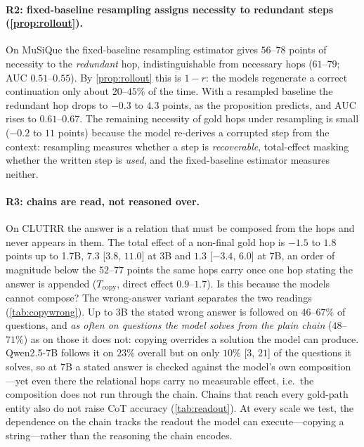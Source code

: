 \documentclass[11pt]{article}
\newcommand{\reldir}{../results/reliance_v2}
\newcommand{\maybeinput}[1]{\IfFileExists{#1}{}{}}
\begin{document}
\paragraph{R2: fixed-baseline resampling assigns necessity to redundant steps (\cref{prop:rollout}).}
On MuSiQue the fixed-baseline resampling estimator gives $56$--$78$ points of necessity to the
\emph{redundant} hop, indistinguishable from necessary hops ($61$--$79$; AUC $0.51$--$0.55$). By
\cref{prop:rollout} this is $1-r$: the models regenerate a correct continuation only about
$20$--$45\%$ of the time. With a resampled baseline the redundant hop drops to $-0.3$ to $4.3$
points, as the proposition predicts, and AUC rises to $0.61$--$0.67$. The remaining necessity of
gold hops under resampling is small ($-0.2$ to $11$ points) because the model re-derives a
corrupted step from the context: resampling measures whether a step is \emph{recoverable},
total-effect masking whether the written step is \emph{used}, and the fixed-baseline estimator
measures neither.

\begin{table}[h]
\centering\small
\caption{Wrong-answer copy. A final hop stating a wrong relation is appended to a CLUTRR gold chain;
we report how often the model's answer is that wrong relation, overall and on questions it answers
correctly from the plain gold chain (PS$=1$).}
\label{tab:copywrong}
\maybeinput{\reldir/tab_copy_wrong.tex}
\end{table}

\paragraph{R3: chains are read, not reasoned over.} On CLUTRR the answer is a relation that must
be composed from the hops and never appears in them. The total effect of a non-final gold hop is
$-1.5$ to $1.8$ points up to 1.7B, $7.3$ [$3.8$, $11.0$] at 3B and $1.3$ [$-3.4$, $6.0$] at 7B,
an order of magnitude below the $52$--$77$ points the same hops carry once one hop stating the
answer is appended ($T_{\text{copy}}$, direct effect $0.9$--$1.7$). Is this because the models
cannot compose? The wrong-answer variant separates the two readings (\cref{tab:copywrong}). Up to
3B the stated wrong answer is followed on $46$--$67\%$ of questions, and \emph{as often on
questions the model solves from the plain chain} ($48$--$71\%$) as on those it does not: copying
overrides a solution the model can produce. Qwen2.5-7B follows it on $23\%$ overall but on only
$10\%$ [$3$, $21$] of the questions it solves, so at 7B a stated answer is checked against the
model's own composition---yet even there the relational hops carry no measurable effect, i.e.\
the composition does not run through the chain. Chains that reach every gold-path entity also do
not raise CoT accuracy (\cref{tab:readout}). At every scale we test, the dependence on the chain
tracks the readout the model can execute---copying a string---rather than the reasoning the chain
encodes.
\end{document}
